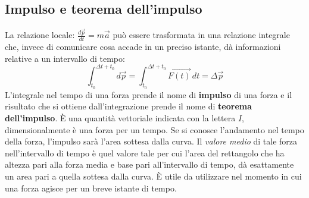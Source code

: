 \documentclass[10pt,a4paper]{book}
\begin{document}
\subsection{Impulso e teorema dell'impulso}

La relazione locale: $\frac{d\vec{p}}{dt}=m\vec{a}$ può essere trasformata in una relazione integrale che, invece di comunicare cosa accade in un preciso istante, dà informazioni relative a un intervallo di tempo:
\[
	\boxed{\int_{t_0}^{\Delta t +t_0} d\vec{p}=\int_{t_0}^{\Delta t +t_0} \vec{F(t)}\,dt=\Delta \vec{p}}
\]
L'integrale nel tempo di una forza prende il nome di \textbf{impulso} di una forza e il risultato che si ottiene dall'integrazione prende il nome di \textbf{teorema dell'impulso}. È una quantità vettoriale indicata con la lettera $I$, dimensionalmente è una forza per un tempo. Se si conosce l'andamento nel tempo della forza, l'impulso sarà l'area sottesa dalla curva. Il \emph{valore medio} di tale forza nell'intervallo di tempo è quel valore tale per cui l'area del rettangolo che ha altezza pari alla forza media e base pari all'intervallo di tempo, dà esattamente un area pari a quella sottesa dalla curva. È utile da utilizzare nel momento in cui una forza agisce per un breve istante di tempo.
\end{document}
